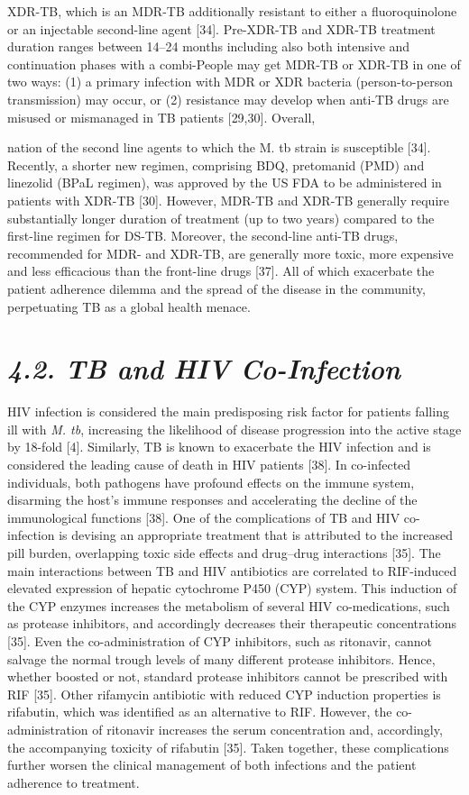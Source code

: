 \documentclass{article}
\begin{document}
XDR-TB, which is an MDR-TB additionally resistant to either a fluoroquinolone or an injectable second-line agent [34]. Pre-XDR-TB and XDR-TB treatment duration ranges between 14–24 months including also both intensive and continuation phases with a combi-People may get MDR-TB or XDR-TB in one of two ways: (1) a primary infection with MDR or XDR bacteria (person-to-person transmission) may occur, or (2) resistance may develop when anti-TB drugs are misused or mismanaged in TB patients [29,30]. Overall,

nation of the second line agents to which the M. tb strain is susceptible [34]. Recently, a shorter new regimen, comprising BDQ, pretomanid (PMD) and linezolid (BPaL regimen), was approved by the US FDA to be administered in patients with XDR-TB [30]. However, MDR-TB and XDR-TB generally require substantially longer duration of treatment (up to two years) compared to the first-line regimen for DS-TB. Moreover, the second-line anti-TB drugs, recommended for MDR- and XDR-TB, are generally more toxic, more expensive and less efficacious than the front-line drugs [37]. All of which exacerbate the patient adherence dilemma and the spread of the disease in the community, perpetuating TB as a global health menace.

\section{\textit{4.2. TB and HIV Co-Infection}}

HIV infection is considered the main predisposing risk factor for patients falling ill with \textit{M. tb}, increasing the likelihood of disease progression into the active stage by 18-fold [4]. Similarly, TB is known to exacerbate the HIV infection and is considered the leading cause of death in HIV patients [38]. In co-infected individuals, both pathogens have profound effects on the immune system, disarming the host's immune responses and accelerating the decline of the immunological functions [38]. One of the complications of TB and HIV co-infection is devising an appropriate treatment that is attributed to the increased pill burden, overlapping toxic side effects and drug–drug interactions [35]. The main interactions between TB and HIV antibiotics are correlated to RIF-induced elevated expression of hepatic cytochrome P450 (CYP) system. This induction of the CYP enzymes increases the metabolism of several HIV co-medications, such as protease inhibitors, and accordingly decreases their therapeutic concentrations [35]. Even the co-administration of CYP inhibitors, such as ritonavir, cannot salvage the normal trough levels of many different protease inhibitors. Hence, whether boosted or not, standard protease inhibitors cannot be prescribed with RIF [35]. Other rifamycin antibiotic with reduced CYP induction properties is rifabutin, which was identified as an alternative to RIF. However, the co-administration of ritonavir increases the serum concentration and, accordingly, the accompanying toxicity of rifabutin [35]. Taken together, these complications further worsen the clinical management of both infections and the patient adherence to treatment.
\end{document}
